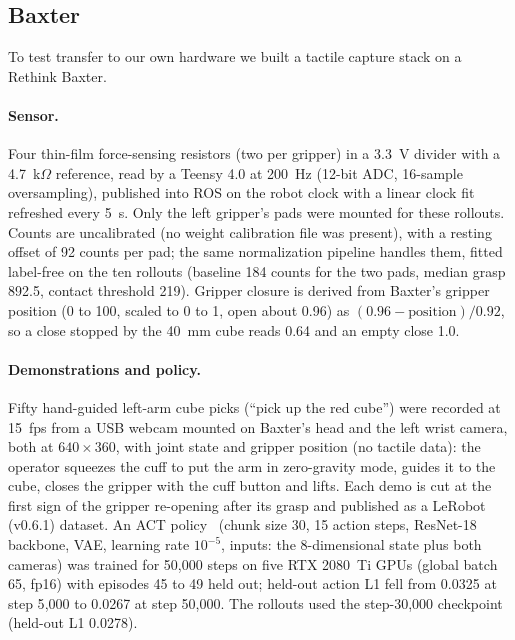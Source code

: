 \documentclass{article}
\begin{document}
\subsection{Baxter}
\label{sec:baxter-setup}

To test transfer to our own hardware we built a tactile capture stack on a Rethink Baxter.

\paragraph{Sensor.} Four thin-film force-sensing resistors (two per gripper) in a 3.3~V divider
with a 4.7~k$\Omega$ reference, read by a Teensy 4.0 at 200~Hz (12-bit ADC, 16-sample
oversampling), published into ROS on the robot clock with a linear clock fit refreshed every
5~s. Only the left gripper's pads were mounted for these rollouts. Counts are uncalibrated (no weight calibration file was present), with a resting offset of 92
counts per pad; the same normalization pipeline handles them, fitted label-free on the ten
rollouts (baseline 184 counts for the two pads, median grasp 892.5, contact threshold 219).
Gripper closure is derived from Baxter's gripper position (0 to 100, scaled to 0 to 1, open
about 0.96) as $(0.96 - \mathrm{position})/0.92$, so a close stopped by the 40~mm cube reads
0.64 and an empty close 1.0.

\paragraph{Demonstrations and policy.} Fifty hand-guided left-arm cube picks (``pick up the red
cube'') were recorded at 15~fps from a USB webcam mounted on Baxter's head and the left wrist
camera, both at $640 \times 360$, with joint state and gripper position (no tactile data): the
operator squeezes the cuff to put the arm in zero-gravity mode, guides it to the cube, closes the
gripper with the cuff button and lifts. Each demo is cut at the first sign of the gripper
re-opening after its grasp and published as a LeRobot~\cite{lerobot} (v0.6.1) dataset. An ACT
policy~\cite{zhao2023act} (chunk size 30, 15 action steps, ResNet-18 backbone, VAE, learning rate
$10^{-5}$, inputs: the 8-dimensional state plus both cameras) was trained for 50{,}000 steps on five RTX
2080~Ti GPUs (global batch 65, fp16) with episodes 45 to 49 held out; held-out action L1 fell from
0.0325 at step 5{,}000 to 0.0267 at step 50{,}000. The rollouts used the step-30{,}000 checkpoint
(held-out L1 0.0278).
\end{document}
